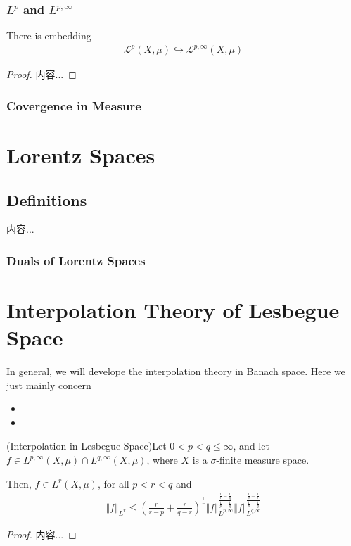 \documentclass[Total.tex]{subfiles}
\begin{document}
		\subsection{$L^p$ and $L^{p,\infty}$}
		
		\begin{proposition}
			There is embedding 
			\begin{gather*}
				\mathcal{L}^p(X,\mu)\hookrightarrow \mathcal{L}^{p,\infty}(X,\mu)
			\end{gather*}
		\end{proposition}
		\begin{proof}
			内容...
		\end{proof}
		
		\subsection{Covergence in Measure}
	\chapter{Lorentz Spaces}
		\section{Definitions}
			\begin{Def}
				内容...
			\end{Def}
			
			
			\subsection{Duals of Lorentz Spaces}
	\chapter{Interpolation Theory of Lesbegue Space}
		In general, we will develope the interpolation theory in Banach space. Here we just mainly concern 
		\begin{itemize}
			\item 
			\item 
		\end{itemize}
		
		
		\begin{proposition}
			(Interpolation in Lesbegue Space)Let $0<p<q\leq \infty$, and let $f\in L^{p,\infty}(X,\mu)\cap L^{q,\infty}(X,\mu)$, where $X$ is a $\sigma$-finite measure space. 
			
			Then, $f\in L^r(X,\mu)$, for all $p<r<q$ and
			\begin{gather*}
				\Vert f\Vert_{L^r}\leq (\frac{r}{r-p}+\frac{r}{q-r})^{\frac{1}{r}}\Vert f\Vert_{L^{p,\infty}}^{\frac{\frac{1}{r}-\frac{1}{q}}{\frac{1}{p}-\frac{1}{q}}}\Vert f\Vert_{L^{q,\infty}}^{\frac{\frac{1}{p}-\frac{1}{r}}{\frac{1}{p}-\frac{1}{q}}}
			\end{gather*}
		\end{proposition}
		\begin{proof}
			内容...
		\end{proof}
		
\end{document}
